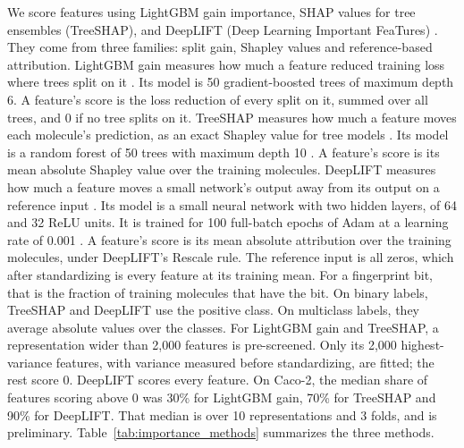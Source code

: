 We score features using LightGBM gain importance, SHAP values for tree ensembles (TreeSHAP), and DeepLIFT (Deep Learning Important FeaTures) \citep{Shrikumar2017}. They come from three families: split gain, Shapley values and reference-based attribution. LightGBM gain measures how much a feature reduced training loss where trees split on it \citep{ke2017lightgbm}. Its model is 50 gradient-boosted trees of maximum depth 6. A feature's score is the loss reduction of every split on it, summed over all trees, and 0 if no tree splits on it. TreeSHAP measures how much a feature moves each molecule's prediction, as an exact Shapley value for tree models \citep{Lundberg2020}. Its model is a random forest of 50 trees with maximum depth 10 \citep{Breiman2001}. A feature's score is its mean absolute Shapley value over the training molecules. DeepLIFT measures how much a feature moves a small network's output away from its output on a reference input \citep{Shrikumar2017, Kokhlikyan2020}. Its model is a small neural network with two hidden layers, of 64 and 32 ReLU units. It is trained for 100 full-batch epochs of Adam at a learning rate of 0.001 \citep{Kingma2015}. A feature's score is its mean absolute attribution over the training molecules, under DeepLIFT's Rescale rule. The reference input is all zeros, which after standardizing is every feature at its training mean. For a fingerprint bit, that is the fraction of training molecules that have the bit. On binary labels, TreeSHAP and DeepLIFT use the positive class. On multiclass labels, they average absolute values over the classes. For LightGBM gain and TreeSHAP, a representation wider than 2,000 features is pre-screened. Only its 2,000 highest-variance features, with variance measured before standardizing, are fitted; the rest score 0. DeepLIFT scores every feature. On Caco-2, the median share of features scoring above 0 was 30\% for LightGBM gain, 70\% for TreeSHAP and 90\% for DeepLIFT. That median is over 10 representations and 3 folds, and is preliminary. Table~\ref{tab:importance_methods} summarizes the three methods.

